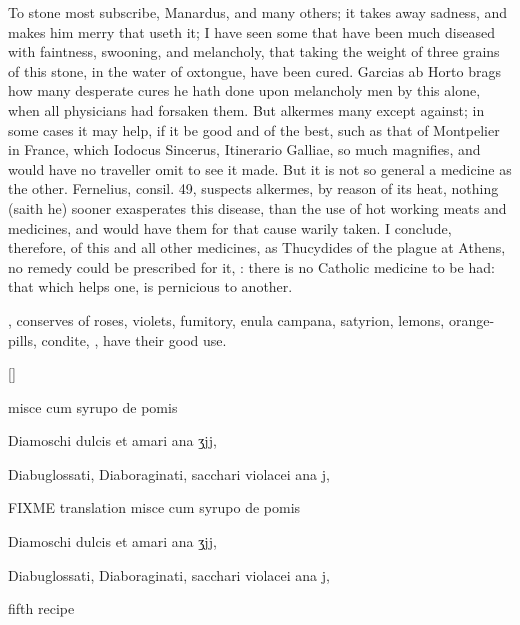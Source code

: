 To  stone most subscribe, Manardus, and many others; it
takes away sadness, and makes him merry that useth it; I have seen some
that have been much diseased with faintness, swooning, and melancholy,
that taking the weight of three grains of this stone, in the water of
oxtongue, have been cured. Garcias ab Horto brags how many desperate
cures he hath done upon melancholy men by this alone, when all
physicians had forsaken them. But alkermes many except against; in some
cases it may help, if it be good and of the best, such as that of
Montpelier in France, which Iodocus Sincerus, Itinerario Galliae,
so much magnifies, and would have no traveller omit to see it made. But
it is not so general a medicine as the other. Fernelius, consil. 49,
suspects alkermes, by reason of its heat, nothing (saith he)
sooner exasperates this disease, than the use of hot working meats and
medicines, and would have them for that cause warily taken. I conclude,
therefore, of this and all other medicines, as Thucydides of the plague
at Athens, no remedy could be prescribed for it, : there is no Catholic medicine to be had: that
which helps one, is pernicious to another.

,
conserves of roses, violets, fumitory, enula campana, satyrion, lemons,
orange-pills, condite, \etc{}, have their good use.

\begin{Prescription}[H]
[\baselineskip]
\begin{prescriptionbox}{}{\textlatin{misce cum syrupo de pomis}}
\item \textlatin{Diamoschi dulcis et amari ana ʒjj},
\item \textlatin{Diabuglossati, Diaboraginati, sacchari violacei ana j},
\end{prescriptionbox}
\begin{prescriptionbox}{FIXME translation }{\textlatin{misce cum syrupo de pomis}}
\item \textlatin{Diamoschi dulcis et amari ana ʒjj},
\item \textlatin{Diabuglossati, Diaboraginati, sacchari violacei ana j},
\end{prescriptionbox}
\caption{fifth recipe}
\end{Prescription}

